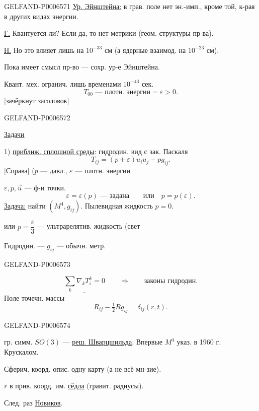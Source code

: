 \begin{GelfandAdjacentEvidence}{GELFAND-P000657}{1}
\underline{Ур. Эйнштейна:} в грав. поле нет эн.-имп., кроме той, к-рая в других видах энергии.

\underline{\underline{Г.}} Квантуется ли? Если да, то нет метрики (геом. структуры пр-ва).

\underline{\underline{Н.}} Но это влияет лишь на \(10^{-33}\) см
(а ядерные взаимод. на \(10^{-23}\) см).

Пока имеет смысл пр-во --- сохр. ур-е Эйнштейна.

Квант. мех. огранич. лишь временами \(10^{-43}\) сек.
\[
T_{00}\text{ --- плотн. энергии}=\varepsilon>0.
\]
[зачёркнут заголовок]
\end{GelfandAdjacentEvidence}
\begin{GelfandAdjacentEvidence}{GELFAND-P000657}{2}

\underline{Задачи}

1) \underline{приближ. сплошной среды}: гидродин. вид с зак. Паскаля
\[
T_{ij}=(p+\varepsilon)u_i u_j-pg_{ij}.
\]
[Справа] (\(p\) --- давл., \(\varepsilon\) --- плотн. энергии

\(\varepsilon,p,\vec u\) --- ф-и точки.
\[
\varepsilon=\varepsilon(p)\text{ --- задана}\qquad\text{или}\quad p=p(\varepsilon).
\]
\underline{Задача:} найти \((M^4,g_{ij})\).
Пылевидная жидкость \(p=0\).

или \(p=\dfrac{\varepsilon}{3}\) --- ультрарелятив. жидкость (свет

Гидродин. --- \(g_{ij}\) --- обычн. метр.
\end{GelfandAdjacentEvidence}
\begin{GelfandAdjacentEvidence}{GELFAND-P000657}{3}

\[
\underline{\sum_k\nabla_k T_i^k=0}\qquad\Longrightarrow\qquad
\text{законы гидродин.}
\]
Поле точечн. массы
\[
R_{ij}-\tfrac12Rg_{ij}=\delta_{ij}(r,t).
\]
\end{GelfandAdjacentEvidence}
\begin{GelfandAdjacentEvidence}{GELFAND-P000657}{4}

гр. симм. \(SO(3)\) --- \underline{реш. Шварцшильда}.
Впервые \(M^4\) указ. в 1960 г. Крускалом.

Сферич. коорд. опис. одну карту (а не всё мн-зие).

\(r\) в прив. коорд. им. \underline{сёдла} (гравит. радиусы).

След. раз \underline{\underline{Новиков}}.
\end{GelfandAdjacentEvidence}
